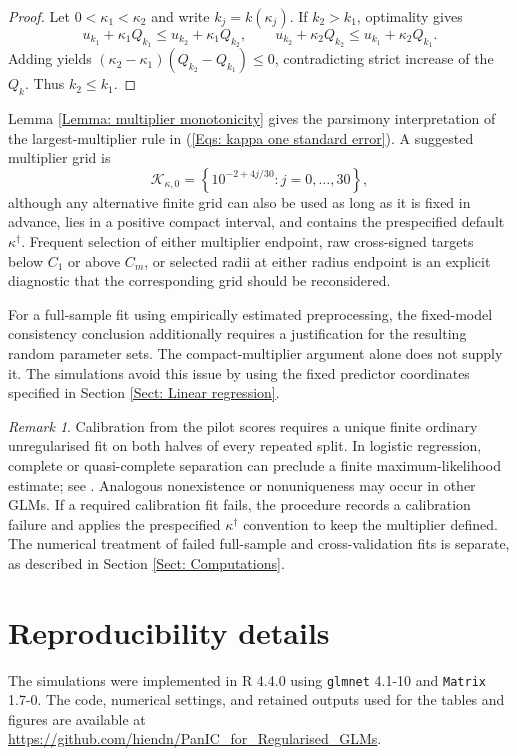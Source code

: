 \documentclass[12pt]{article}
\newenvironment{bluechange}{\begingroup\color[rgb]{0.00,0.00,1.00}}{\endgroup}
\theoremstyle{remark}
\newtheorem{remark}{Remark}
\theoremstyle{plain}
\begin{document}
\begin{bluechange}
\begin{proof}
Let $0<\kappa_1<\kappa_2$ and write $k_j=k(\kappa_j)$. If $k_2>k_1$, optimality gives
\[
u_{k_1}+\kappa_1Q_{k_1}\le u_{k_2}+\kappa_1Q_{k_2},
\qquad
u_{k_2}+\kappa_2Q_{k_2}\le u_{k_1}+\kappa_2Q_{k_1}.
\]
Adding yields $(\kappa_2-\kappa_1)(Q_{k_2}-Q_{k_1})\le0$, contradicting strict increase of the $Q_k$. Thus $k_2\le k_1$.
\end{proof}

Lemma \ref{Lemma: multiplier monotonicity} gives the parsimony interpretation of the largest-multiplier rule in (\ref{Eqs: kappa one standard error}). A suggested multiplier grid is
\[
\mathcal K_{\kappa,0}
=\left\{10^{-2+4j/30}:j=0,\ldots,30\right\},
\]
although any alternative finite grid can also be used as long as it is fixed in advance, lies in a positive compact interval, and contains the prespecified default $\kappa^\dagger$. Frequent selection of either multiplier endpoint, raw cross-signed targets below $C_1$ or above $C_m$, or selected radii at either radius endpoint is an explicit diagnostic that the corresponding grid should be reconsidered.

For a full-sample fit using empirically estimated preprocessing, the fixed-model consistency conclusion additionally requires a justification for the resulting random parameter sets. The compact-multiplier argument alone does not supply it. The simulations avoid this issue by using the fixed predictor coordinates specified in Section \ref{Sect: Linear regression}.



\begin{remark}\label{Rem: pilot existence}
Calibration from the pilot scores requires a unique finite ordinary unregularised fit on both halves of every repeated split. In logistic regression, complete or quasi-complete separation can preclude a finite maximum-likelihood estimate; see \citet{albert_anderson_1984}. Analogous nonexistence or nonuniqueness may occur in other GLMs. If a required calibration fit fails, the procedure records a calibration failure and applies the prespecified $\kappa^\dagger$ convention to keep the multiplier defined. The numerical treatment of failed full-sample and cross-validation fits is separate, as described in Section \ref{Sect: Computations}.
\end{remark}
\end{bluechange}

\begin{bluechange}
\section{Reproducibility details}\label{App: reproducibility}
The simulations were implemented in R 4.4.0 using \texttt{glmnet} 4.1-10 and \texttt{Matrix} 1.7-0. The code, numerical settings, and retained outputs used for the tables and figures are available at \url{https://github.com/hiendn/PanIC_for_Regularised_GLMs}.
\end{bluechange}
\end{document}
